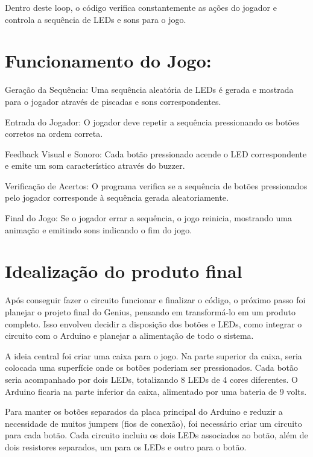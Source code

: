 \documentclass[
]{book}
\begin{document}
Dentro deste loop, o código verifica constantemente as ações do jogador e controla a sequência de LEDs e sons para o jogo.

\section{Funcionamento do Jogo:}\label{funcionamento-do-jogo}

Geração da Sequência: Uma sequência aleatória de LEDs é gerada e mostrada para o jogador através de piscadas e sons correspondentes.

Entrada do Jogador: O jogador deve repetir a sequência pressionando os botões corretos na ordem correta.

Feedback Visual e Sonoro: Cada botão pressionado acende o LED correspondente e emite um som característico através do buzzer.

Verificação de Acertos: O programa verifica se a sequência de botões pressionados pelo jogador corresponde à sequência gerada aleatoriamente.

Final do Jogo: Se o jogador errar a sequência, o jogo reinicia, mostrando uma animação e emitindo sons indicando o fim do jogo.

\section{Idealização do produto final}\label{idealizauxe7uxe3o-do-produto-final}

Após conseguir fazer o circuito funcionar e finalizar o código, o próximo passo foi planejar o projeto final do Genius, pensando em transformá-lo em um produto completo. Isso envolveu decidir a disposição dos botões e LEDs, como integrar o circuito com o Arduino e planejar a alimentação de todo o sistema.

A ideia central foi criar uma caixa para o jogo. Na parte superior da caixa, seria colocada uma superfície onde os botões poderiam ser pressionados. Cada botão seria acompanhado por dois LEDs, totalizando 8 LEDs de 4 cores diferentes. O Arduino ficaria na parte inferior da caixa, alimentado por uma bateria de 9 volts.

Para manter os botões separados da placa principal do Arduino e reduzir a necessidade de muitos jumpers (fios de conexão), foi necessário criar um circuito para cada botão. Cada circuito incluiu os dois LEDs associados ao botão, além de dois resistores separados, um para os LEDs e outro para o botão.
\end{document}
